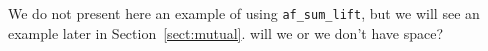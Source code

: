 \documentclass{llncs}
\newcommand{\dv}[1]{{\color{red}{\bf DV:} #1}}
\begin{document}
%
%  

We do not present here an example of using \lstinline|af_sum_lift|, but we will see an example
later in Section~\ref{sect:mutual}. \dv{will we or we don't have space?} 
\end{document}
